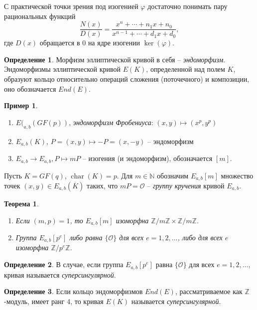 \documentclass[a4paper,12pt]{article}
\newcommand{\ZZ}{\mathbb{Z}}
\newcommand{\NN}{\mathbb{N}}
\DeclareMathOperator{\Char}{char}
\newtheorem{theorem}{Теорема}
\theoremstyle{definition}
\newtheorem{definition}{Определение}
\newtheorem{example}{Пример}
\begin{document}
С практической точки зрения под изогенией $\varphi$ достаточно понимать пару рациональных функций
$$
\frac{N(x)}{D(x)}=\frac{x^n+\cdots+n_1x+n_0}{x^{n-1}+\cdots+d_1x+d_0},
$$
где $D(x)$ обращается в $0$ на ядре изогении $\ker(\varphi)$.


\begin{definition}
Морфизм эллиптической кривой в себя -- \emph{эндоморфизм}.
Эндоморфизмы эллиптической кривой $E(K)$, определенной над полем $K$, образуют кольцо относительно операций сложения (поточечного) и композиции, оно обозначается $End(E)$. 
\end{definition}

\begin{example}
\begin{enumerate}

\item $E(_{a,b}(GF(p))$, \emph{эндоморфизм Фробениуса}: $(x,y)\mapsto (x^p,y^p)$

\item $E_{a,b}(K)$, $P=(x,y)\mapsto -P=(x,-y)$ -- эндоморфизм

\item $E_{a,b}\to E_{a,b}, P\mapsto mP$ -- изогения (и эндоморфизм), обозначается $[m]$.
\end{enumerate}
\end{example}

Пусть $K=GF(q)$, $\Char (K)=p$. Для $m\in\NN$ обозначим $E_{a,b}[m]$ множество точек $(x,y)\in E_{a,b}(\overline{K})$ таких, что $mP=\mathcal{O}$ -- \emph{группу кручения} кривой $E_{a,b}$. 

\begin{theorem}\label{thx}
 \begin{enumerate}
  \item Если $(m,p)=1$, то  $E_{a,b}[m]$ изоморфна $\ZZ/m\ZZ\times \ZZ/m\ZZ$.
  \item Группа $E_{a,b}[p^e] $ либо равна $\{\mathcal{O}\}$ для всех $e=1,2,\dots$, %
  либо для всех $e$  изоморфна $\ZZ/p^e\ZZ$.  
 \end{enumerate}
\end{theorem}

\begin{definition}
В случае, если группа $E_{a,b}[p^e] $  равна $\{\mathcal{O}\}$ для всех $e=1,2,\dots$, кривая называется \emph{суперсингулярной}.
\end{definition}

\begin{definition}
Если кольцо эндоморфизмов $End(E)$, рассматриваемое как $\ZZ$-модуль, имеет ранг 4, то кривая  $E(K)$ называется \emph{суперсингулярной}. 
\end{definition}
\end{document}
